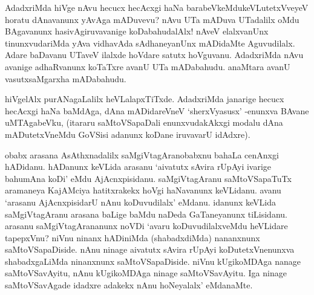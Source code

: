 AdadxriMda hiVge nAvu hecucx hecAcxgi haNa barabeVkeMdukeVLutetxVveyeV horatu dAnavanunx yAvAga mADuvevu? nAvu UTa mADuva UTadalilx oMdu BAgavanunx hasivAgiruvavanige koDabahudalAlx! nAveV elalxvanUnx tinunxvudariMda yAva vidhavAda sAdhaneyanUnx mADidaMte Aguvudilalx. Adare baDavanu UTaveV ilalxde hoVdare satutx hoVguvanu. AdadxriMda nAvu avanige adhaRvanunx koTaTxre avanU UTa mADabahudu. anaMtara avanU vasutxsaMgarxha mADabahudu.

hiVgelAlx purANagaLalilx heVLalapxTiTxde. AdadxriMda janarige hecucx hecAcxgi haNa baMdAga, dAna mADidareVneV `sherxVyasusx' -enunxva BAvane uMTAgabeVku, (itararu saMtoVSapaDali enunxvudakAkxgi modalu dAna mADutetxVneMdu GoVSisi adanunx koDane iruvavarU idAdxre).

obabx arasana AsAthxnadalilx saMgiVtagAranobabxnu bahaLa cenAnxgi hADidanu. hADanunx keVLida arasanu `aivatutx sAvira rUpAyi ivarige bahumAna koDi' eMdu AjAcnxpisidanu. saMgiVtagAranu saMtoVSapaTuTx aramaneya KajAMciya hatitxrakekx hoVgi haNavanunx keVLidanu. avanu `arasanu AjAcnxpisidarU nAnu koDuvudilalx' eMdanu. idanunx keVLida saMgiVtagAranu arasana baLige baMdu naDeda GaTaneyanunx tiLisidanu. arasanu saMgiVtagArananunx noVDi `avaru koDuvudilalxveMdu heVLidare tapepxVnu? niVnu ninanx hADiniMda (shabadxdiMda) nananxnunx saMtoVSapaDiside. nAnu ninage aivatutx sAvira rUpAyi koDutetxVnenunxva shabadxgaLiMda ninanxnunx saMtoVSapaDiside. niVnu kUgikoMDAga nanage saMtoVSavAyitu, nAnu kUgikoMDAga ninage saMtoVSavAyitu. Iga ninage saMtoVSavAgade idadxre adakekx nAnu hoNeyalalx' eMdanaMte.

